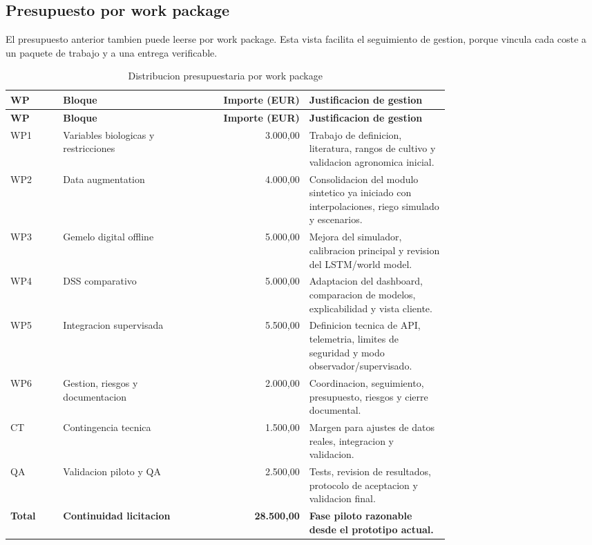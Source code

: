 ﻿\documentclass[11pt,a4paper]{article}
\begin{document}
\subsection{Presupuesto por work package}

El presupuesto anterior tambien puede leerse por work package. Esta vista facilita el seguimiento de gestion, porque vincula cada coste a un paquete de trabajo y a una entrega verificable.

\begin{longtable}{p{0.12\linewidth}p{0.30\linewidth}r p{0.32\linewidth}}
\caption{Distribucion presupuestaria por work package}\\
\toprule
\textbf{WP} & \textbf{Bloque} & \textbf{Importe (EUR)} & \textbf{Justificacion de gestion} \\
\midrule
\endfirsthead
\toprule
\textbf{WP} & \textbf{Bloque} & \textbf{Importe (EUR)} & \textbf{Justificacion de gestion} \\
\midrule
\endhead
WP1 & Variables biologicas y restricciones & 3.000,00 & Trabajo de definicion, literatura, rangos de cultivo y validacion agronomica inicial. \\ \addlinespace
WP2 & Data augmentation & 4.000,00 & Consolidacion del modulo sintetico ya iniciado con interpolaciones, riego simulado y escenarios. \\ \addlinespace
WP3 & Gemelo digital offline & 5.000,00 & Mejora del simulador, calibracion principal y revision del LSTM/world model. \\ \addlinespace
WP4 & DSS comparativo & 5.000,00 & Adaptacion del dashboard, comparacion de modelos, explicabilidad y vista cliente. \\ \addlinespace
WP5 & Integracion supervisada & 5.500,00 & Definicion tecnica de API, telemetria, limites de seguridad y modo observador/supervisado. \\ \addlinespace
WP6 & Gestion, riesgos y documentacion & 2.000,00 & Coordinacion, seguimiento, presupuesto, riesgos y cierre documental. \\ \addlinespace
CT & Contingencia tecnica & 1.500,00 & Margen para ajustes de datos reales, integracion y validacion. \\ \addlinespace
QA & Validacion piloto y QA & 2.500,00 & Tests, revision de resultados, protocolo de aceptacion y validacion final. \\
\midrule
\textbf{Total} & \textbf{Continuidad licitacion} & \textbf{28.500,00} & \textbf{Fase piloto razonable desde el prototipo actual.} \\
\bottomrule
\end{longtable}
\end{document}
